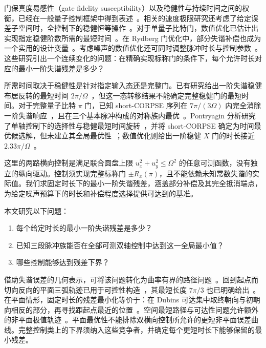 \documentclass[12pt]{iopjournal}
\theoremstyle{definition}
\begin{document}
门保真度易感性（gate fidelity susceptibility）以及稳健性与持续时间之间的权衡，已经在一般量子控制框架中得到表述~\cite{poggi2024}。相关的速度极限研究还考虑了给定误差子空间时，全控制下的稳健恒等操作~\cite{balada2026}。对于单量子比特门，数值优化已估计出实现指定稳健阶数所需的最短时间~\cite{cao2024}。在 Rydberg 门优化中，部分失谐补偿也成为一个实用的设计变量~\cite{bataille2026}。考虑噪声的数值优化还可同时调整脉冲时长与控制参数~\cite{jeon2026}。这些研究引出一个连续变化的问题：在精确实现标称门的条件下，每个允许时长对应的最小一阶失谐残差是多少？

所需时间取决于稳健性是针对指定输入态还是完整门。已有研究给出一阶失谐稳健布居反转的最短时间 $2\pi/\Omega$~\cite{vandamme2017}，但这一态转移结果不能确定完整稳健门的最短时间。对于完整量子比特 $\pi$ 门，已知 short-CORPSE 序列在 $7\pi/(3\Omega)$ 内完全消除一阶失谐响应~\cite{cummins2003}，且在三个基本脉冲构成的对称族内最优~\cite{kukita2022}。Pontryagin 分析研究了单轴控制下的选择性与稳健最短时间旋转~\cite{ansel2021}，并将 short-CORPSE 确定为时间最优候选解，但未建立其全局最优性~\cite{kukita2024}；数值优化则给出一阶稳健 $X$ 门的时长接近 $2.33\pi/\Omega$~\cite{cao2024}。

这里的两路横向控制是满足联合圆盘上限 $u_x^2+u_y^2\le\Omega^2$ 的任意可测函数，没有独立的纵向驱动。控制须实现完整标称门 $\pm R_x(\pi)$，且不能依赖未知常数失谐的实际值。我们求固定时长下的最小一阶失谐残差，涵盖部分补偿及其完全抵消端点，为给定噪声预算下的时长和补偿程度选择提供可达到的基准。

本文研究以下问题：
\begin{enumerate}
\rightskip=0pt plus1fil
\item 每个给定时长的最小一阶失谐残差是多少？
\item 已知三段脉冲族能否在全部可测双轴控制中达到这一全局最小值？
\item 哪些控制能够达到残差下界？
\end{enumerate}

借助失谐误差的几何表示，可将该问题转化为曲率有界的路径问题~\cite{zeng2018,zeng2019,piliouras2026}。回到起点而切向反向的平面三弧轨迹已用于可控性构造~\cite{sigalotti2006}，其最短长度 $7\pi/3$ 也已明确给出~\cite{kim2013}。在平面情形，固定时长的残差最小化等价于：在 Dubins 可达集中取终朝向与初朝向相反的部分，再寻找距起点最近的位置~\cite{cockayne1975,patsko2003}。空间最短路径与可达性问题允许额外的非平面极值轨迹~\cite{sussmann1995,bae2025,bae2026,moser2022}。平面最优性不能排除双横向控制所允许的更短非平面误差曲线。完整控制类上的下界须纳入这些竞争者，并确定每个更短时长下能够保留的最小残差。
\end{document}
